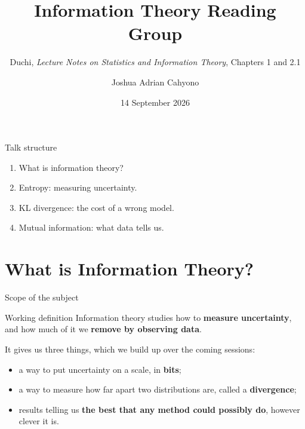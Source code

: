 \documentclass[aspectratio=169,9pt]{beamer}
\title[Information Theory Reading Group]{Information Theory Reading Group}
\subtitle{Duchi, \textit{Lecture Notes on Statistics and Information Theory}, Chapters 1 and 2.1}
\author{Joshua Adrian Cahyono}
\institute{EPIC LAB Nanyang Technological University}
\date{14 September 2026}
\newcommand{\orange}[1]{\textcolor{AmazonOrange}{\textbf{#1}}}
\begin{document}
\begin{frame}[plain]
  \titlepage
\end{frame}

\begin{frame}{Talk structure}
\vfill
{\LARGE
\begin{enumerate}
    \setlength{\itemsep}{0.5cm}
    \item What is information theory?
    \item Entropy: measuring uncertainty.
    \item KL divergence: the cost of a wrong model.
    \item Mutual information: what data tells us.
\end{enumerate}
}
\vfill
\end{frame}

\section{What is Information Theory?}

\begin{frame}{Scope of the subject}
\vspace{0.2cm}
\pause
\begin{block}{Working definition}
Information theory studies how to \orange{measure uncertainty}, and how much of it we \orange{remove by observing data}.
\end{block}
\pause
\vspace{0.1cm}
It gives us three things, which we build up over the coming sessions:
\begin{itemize}
    \item a way to put uncertainty on a scale, in \orange{bits};
    \item a way to measure how far apart two distributions are, called a \orange{divergence};
    \item results telling us \orange{the best that any method could possibly do}, however clever it is.
\end{itemize}
\end{frame}
\end{document}

